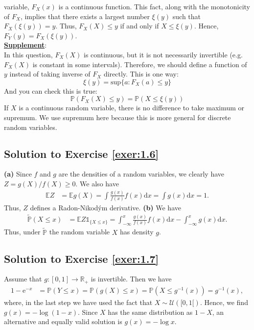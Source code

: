 \documentclass[12pt]{book}
\numberwithin{equation}{chapter}
\theoremstyle{plain}
\numberwithin{theorem}{section}
\theoremstyle{definition}
\numberwithin{exercise}{chapter}
\newcommand{\<}{\langle}
\renewcommand{\>}{\rangle}
\renewcommand{\(}{\left(}
\renewcommand{\)}{\right)}
\renewcommand{\[}{\left[}
\renewcommand{\]}{\right]}
\newcommand\Eb{\mathds{E}}
\newcommand\Ib{\mathds{1}} 	%
\newcommand\Pb{\mathds{P}}
\newcommand\Rb{\mathds{R}}
\newcommand\Uc{\mathscr{U}}
\newcommand\Pbt{\widetilde{\Pb}}
\newcommand\dd{\mathrm{d}}
\newcommand\ee{\mathrm{e}}
\begin{document}
variable, $F_X(x)$ is a continuous function. This fact, along with the monotonicity of $F_X$, implies that there exists 
a largest number $\xi(y)$ such that $F_X(\xi(y)) = y$. Thus, $F_X(X) \leq y$ if and only if $X \leq \xi(y)$. Hence, 
$F_Y(y) = F_X(\xi(y))$.
\\[0.5em]
\textbf{\underline{Supplement}}:\\
In this question, $F_X(X)$ is continuous, but it is not necessarily invertible (e.g. $F_X(X)$ is constant in some intervals). Therefore, we should define a function of $y$ instead of taking inverse of $F_X$ directly. This is one way:\\
$$\xi(y) = \text{sup} \{ a : F_X(a) \le y \}$$
And you can check this is true:
$$\Pb(F_X(X) \le y) = \Pb(X \le \xi(y))  $$
If $X$ is a continuous random variable, there is no difference to take maximum or supremum. We use supremum here because this is more general for discrete random variables. 

\subsection*{Solution to Exercise \ref{exer:1.6}}
\textbf{(a)} Since $f$ and $g$ are the densities of a random variables, we clearly have $Z = g(X)/f(X) \geq 0$.  We also have
\begin{align}
\Eb Z
	&=	\Eb g(X) = \int \frac{g(x)}{f(x)}f(x) \dd x = \int g(x) \dd x = 1.
\end{align}
Thus, $Z$ defines a Radon-Nikod\'ym derivative.
\textbf{(b)} We have
\begin{align}
\Pbt(X \leq x)
	&=	\Eb Z \Ib_{\{X \leq x\}}
	=		\int_{-\infty}^x \frac{g(x)}{f(x)} f(x) \dd x
	-		\int_{-\infty}^x g(x) \dd x .
\end{align}
Thus, under $\Pbt$ the random variable $X$ has density $g$.

\subsection*{Solution to Exercise \ref{exer:1.7}}
Assume that $g:[0,1] \to \Rb_+$ is invertible.  Then we have
\begin{align}
1 - \ee^{-x}
	&=	\Pb( Y \leq x)
	=		\Pb( g(X) \leq x )
	=		\Pb( X \leq g^{-1}(x) )
	=		g^{-1}(x) ,
\end{align}
where, in the last step we have used the fact that $X \sim \Uc([0,1[)$.  Hence, we find $g(x) = - \log (1- x)$.  Since $X$ has the same distribution as $1-X$, an alternative and equally valid solution is $g(x) = - \log x$.
\end{document}
